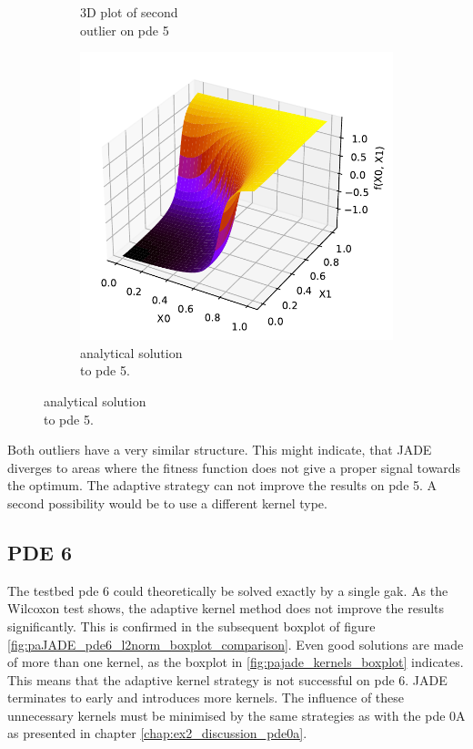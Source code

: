 \documentclass[./\jobname.tex]{subfiles}
\begin{document}
\begin{figure}[H]
\begin{subfigure}[b]{0.3333\linewidth}
		\caption{3D plot of second \\outlier on \gls{pde} 5}
		\label{fig:paJADE_pde5_outlier1}
	\end{subfigure}%
	\begin{subfigure}[b]{0.3333\linewidth}
		\centering
		\includegraphics[width=1\textwidth]{../../code/testbed/pde5/sol_pde_5.pdf}
		\caption{analytical solution \\to \gls{pde} 5.}
		\label{fig:pde5_analytical_solution_2}
	\end{subfigure}%
	\label{fig:paJADE_pde5_3D_plot_outlier}
\end{figure}

Both outliers have a very similar structure. This might indicate, that JADE diverges to areas where the fitness function does not give a proper signal towards the optimum. The adaptive strategy can not improve the results on \gls{pde} 5. A second possibility would be to use a different kernel type. 


\subsection{PDE 6}

The testbed \gls{pde} 6 could theoretically be solved exactly by a single \gls{gak}. As the Wilcoxon test shows, the adaptive kernel method does not improve the results significantly. This is confirmed in the subsequent boxplot of figure \ref{fig:paJADE_pde6_l2norm_boxplot_comparison}. Even good solutions are made of more than one kernel, as the boxplot in \ref{fig:pajade_kernels_boxplot} indicates. This means that the adaptive kernel strategy is not successful on \gls{pde} 6. JADE terminates to early and introduces more kernels. The influence of these unnecessary kernels must be minimised by the same strategies as with the \gls{pde} 0A as presented in chapter \ref{chap:ex2_discussion_pde0a}.
\end{document}
